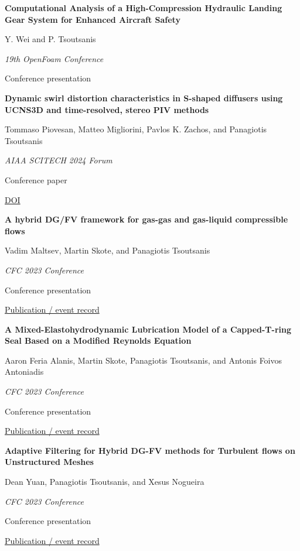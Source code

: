 \documentclass[11pt,a4paper]{article}
\newlength{\cventrysep}
\newenvironment{cventry}{%
  \par\noindent\begin{minipage}{\linewidth}
  \RaggedRight\fontsize{9.8}{12.5}\selectfont
}{\end{minipage}\par\addvspace{\cventrysep}}
\newcommand{\cvtitle}[1]{{\bfseries #1\par}\vspace{1pt}}
\newcommand{\cvdetail}[1]{{#1\par}\vspace{1pt}}
\newcommand{\cvmeta}[1]{{\fontsize{9}{11.5}\selectfont\color{Muted}#1\par}\vspace{1pt}}
\newcommand{\cvlinks}[1]{{\fontsize{9}{11.5}\selectfont #1\par}}
\newcommand{\cvyear}[1]{{\color{Teal}\bfseries\fontsize{11}{13}\selectfont #1\par}\vspace{6pt}}
\begin{document}
\begin{cventry}
\cvtitle{Computational Analysis of a High-Compression Hydraulic Landing Gear System for Enhanced Aircraft Safety}
\cvdetail{Y. Wei and P. Tsoutsanis}
\cvmeta{\textit{19th OpenFoam Conference}\par Conference presentation}
\end{cventry}

\begin{cventry}
\cvtitle{Dynamic swirl distortion characteristics in S-shaped diffusers using UCNS3D and time-resolved, stereo PIV methods}
\cvdetail{Tommaso Piovesan, Matteo Migliorini, Pavlos K. Zachos, and Panagiotis Tsoutsanis}
\cvmeta{\textit{AIAA SCITECH 2024 Forum}\par Conference paper}
\cvlinks{\href{https://doi.org/10.2514/6.2024-1196}{DOI}}
\end{cventry}

\begin{cventry}
\cvyear{2023}
\cvtitle{A hybrid DG/FV framework for gas-gas and gas-liquid compressible flows}
\cvdetail{Vadim Maltsev, Martin Skote, and Panagiotis Tsoutsanis}
\cvmeta{\textit{CFC 2023 Conference}\par Conference presentation}
\cvlinks{\href{https://cfc2023.iacm.info/event/contribution/22f331e2-334f-11ed-8e5b-000c29ddfc0c}{Publication / event record}}
\end{cventry}

\begin{cventry}
\cvtitle{A Mixed-Elastohydrodynamic Lubrication Model of a Capped-T-ring Seal Based on a Modified Reynolds Equation}
\cvdetail{Aaron Feria Alanis, Martin Skote, Panagiotis Tsoutsanis, and Antonis Foivos Antoniadis}
\cvmeta{\textit{CFC 2023 Conference}\par Conference presentation}
\cvlinks{\href{https://cfc2023.iacm.info/event/contribution/92a1822e-48a6-11ed-9b3c-000c29ddfc0c}{Publication / event record}}
\end{cventry}

\begin{cventry}
\cvtitle{Adaptive Filtering for Hybrid DG-FV methods for Turbulent flows on Unstructured Meshes}
\cvdetail{Dean Yuan, Panagiotis Tsoutsanis, and Xesus Nogueira}
\cvmeta{\textit{CFC 2023 Conference}\par Conference presentation}
\cvlinks{\href{https://cfc2023.iacm.info/event/contribution/1844a0ab-38c8-11ed-8e5b-000c29ddfc0c}{Publication / event record}}
\end{cventry}
\end{document}
